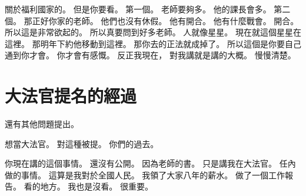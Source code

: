 \hypertarget{c01:cue:2986}{}關於福利國家的。
\hypertarget{c01:cue:2987}{}但是你要看。
\hypertarget{c01:cue:2988}{}第一個。
\hypertarget{c01:cue:2989}{}老師要夠多。
\hypertarget{c01:cue:2990}{}他的課長會多。
\hypertarget{c01:cue:2991}{}第二個。
\hypertarget{c01:cue:2992}{}那正好你家的老師。
\hypertarget{c01:cue:2993}{}他們也沒有休假。
\hypertarget{c01:cue:2994}{}他有開合。
\hypertarget{c01:cue:2995}{}他有什麼戰會。
\hypertarget{c01:cue:2996}{}開合。
\hypertarget{c01:cue:2997}{}所以這是非常欲起的。
\hypertarget{c01:cue:2998}{}所以真要問到好多老師。
\hypertarget{c01:cue:2999}{}人就像星星。
\hypertarget{c01:cue:3000}{}現在就這個星星在這裡。
\hypertarget{c01:cue:3001}{}那明年下約他移動到這裡。
\hypertarget{c01:cue:3002}{}那你去的正法就成掉了。
\hypertarget{c01:cue:3003}{}所以這個是你要自己通到你才會。
\hypertarget{c01:cue:3004}{}你才會有感慨。
\hypertarget{c01:cue:3005}{}反正我現在，
\hypertarget{c01:cue:3006}{}對我講就是講的大概。
\hypertarget{c01:cue:3007}{}慢慢清楚。

\section{大法官提名的經過}

\hypertarget{c01:cue:3008}{}還有其他問題提出。

\hypertarget{c01:cue:3009}{}想當大法官。
\hypertarget{c01:cue:3010}{}對這種被提。
\hypertarget{c01:cue:3011}{}你們的過去。

\hypertarget{c01:cue:3012}{}你現在講的這個事情。
\hypertarget{c01:cue:3013}{}還沒有公開。
\hypertarget{c01:cue:3014}{}因為老師的書。
\hypertarget{c01:cue:3015}{}只是講我在大法官。
\hypertarget{c01:cue:3016}{}任內做的事情。
\hypertarget{c01:cue:3017}{}這算是我對於全國人民。
\hypertarget{c01:cue:3018}{}我領了大家八年的薪水。
\hypertarget{c01:cue:3019}{}做了一個工作報告。
\hypertarget{c01:cue:3020}{}看的地方。
\hypertarget{c01:cue:3021}{}我也是沒看。
\hypertarget{c01:cue:3022}{}很重要。

